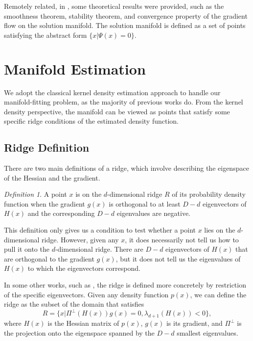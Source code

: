 \documentclass[aos,preprint]{imsart}
\theoremstyle{remark}
\newtheorem{definition}[theorem]{Definition}
\begin{document}
Remotely related, in \cite{chen2020solution}, some theoretical results were provided, such as the smoothness theorem, stability theorem, and convergence property of the gradient flow on the solution manifold. The solution manifold is defined as a set of points satisfying the abstract form $\{x| \Psi(x) = 0\}$.

\section{Manifold Estimation}

We adopt the classical kernel density estimation approach to handle our manifold-fitting problem, as the majority of previous works do. From the kernel density perspective, the manifold can be viewed as points that satisfy some specific ridge conditions of the estimated density function.
\subsection{Ridge Definition}
There are two main definitions of a ridge, which involve describing the eigenspace of the Hessian and the gradient.
\begin{definition}\label{RR}
A point $x$ is on the $d$-dimensional ridge $R$ of its probability density function when the gradient $g(x)$ is orthogonal to at least $D-d$ eigenvectors of $H(x)$ and the corresponding $D-d$ eigenvalues are negative. \cite{ozertem2011locally}
\end{definition}
This definition only gives us a condition to test whether a point $x$ lies on the $d$-dimensional ridge. However, given any $x$, it does necessarily not tell us how to pull it onto the $d$-dimensional ridge. There are $D-d$ eigenvectors of $H(x)$ that are orthogonal to the gradient $g(x)$, but it does not tell us the eigenvalues of $H(x)$ to which the eigenvectors correspond.

In some other works, such as \cite{genovese2014nonparametric}, the ridge is defined more concretely by restriction of the specific eigenvectors. Given any density function $p(x)$, we can define the ridge as the subset of the domain that satisfies
\begin{equation}\label{ridgeDF}
R = \{x| \Pi^{\perp}(H(x)) g(x) = 0, \lambda_{d+1}(H(x))<0\},
\end{equation}
where $H(x)$ is the Hessian matrix of $p(x)$, $g(x)$ is its gradient, and $\Pi^{\perp}$ is the projection onto the eigenspace spanned by the $D-d$ smallest eigenvalues.
\end{document}
